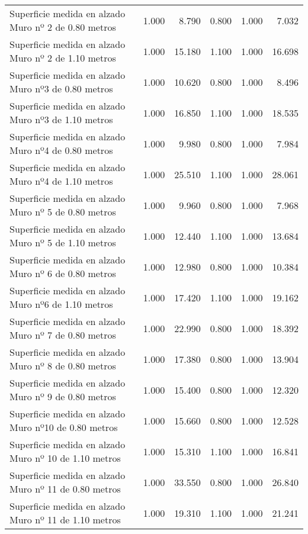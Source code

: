 \documentclass{book}%
\begin{document}
\begin{longtable}{lrrrrr}
\multicolumn{1}{p{3.5cm}}{Superficie medida en alzado Muro nº 2 de 0.80 metros }&1.000&8.790&0.800&1.000&7.032\\%
\multicolumn{1}{p{3.5cm}}{Superficie medida en alzado Muro nº 2 de 1.10 metros }&1.000&15.180&1.100&1.000&16.698\\%
\multicolumn{1}{p{3.5cm}}{Superficie medida en alzado Muro nº3 de 0.80 metros }&1.000&10.620&0.800&1.000&8.496\\%
\multicolumn{1}{p{3.5cm}}{Superficie medida en alzado Muro nº3 de 1.10 metros }&1.000&16.850&1.100&1.000&18.535\\%
\multicolumn{1}{p{3.5cm}}{Superficie medida en alzado Muro nº4 de 0.80 metros }&1.000&9.980&0.800&1.000&7.984\\%
\multicolumn{1}{p{3.5cm}}{Superficie medida en alzado Muro nº4 de 1.10 metros }&1.000&25.510&1.100&1.000&28.061\\%
\multicolumn{1}{p{3.5cm}}{Superficie medida en alzado Muro nº 5 de 0.80 metros }&1.000&9.960&0.800&1.000&7.968\\%
\multicolumn{1}{p{3.5cm}}{Superficie medida en alzado Muro nº 5 de 1.10 metros }&1.000&12.440&1.100&1.000&13.684\\%
\multicolumn{1}{p{3.5cm}}{Superficie medida en alzado Muro nº 6 de 0.80 metros }&1.000&12.980&0.800&1.000&10.384\\%
\multicolumn{1}{p{3.5cm}}{Superficie medida en alzado Muro nº6 de 1.10 metros }&1.000&17.420&1.100&1.000&19.162\\%
\multicolumn{1}{p{3.5cm}}{Superficie medida en alzado Muro nº 7 de 0.80 metros }&1.000&22.990&0.800&1.000&18.392\\%
\multicolumn{1}{p{3.5cm}}{Superficie medida en alzado Muro nº 8 de 0.80 metros }&1.000&17.380&0.800&1.000&13.904\\%
\multicolumn{1}{p{3.5cm}}{Superficie medida en alzado Muro nº 9 de 0.80 metros }&1.000&15.400&0.800&1.000&12.320\\%
\multicolumn{1}{p{3.5cm}}{Superficie medida en alzado Muro nº10 de 0.80 metros }&1.000&15.660&0.800&1.000&12.528\\%
\multicolumn{1}{p{3.5cm}}{Superficie medida en alzado Muro nº 10 de 1.10 metros }&1.000&15.310&1.100&1.000&16.841\\%
\multicolumn{1}{p{3.5cm}}{Superficie medida en alzado Muro nº 11 de 0.80 metros }&1.000&33.550&0.800&1.000&26.840\\%
\multicolumn{1}{p{3.5cm}}{Superficie medida en alzado Muro nº 11 de 1.10 metros }&1.000&19.310&1.100&1.000&21.241\\%

\end{longtable}
\end{document}
